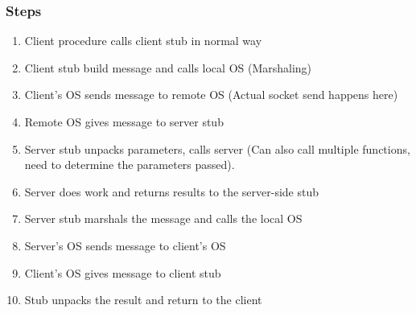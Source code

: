 \subsubsection{Steps}\label{subsubsec:RPC_Steps}
\begin{enumerate}[noitemsep]
\item Client procedure calls client stub in normal way
\item Client stub build message and calls local OS (Marshaling)
\item Client's OS sends message to remote OS (Actual socket send happens here)
\item Remote OS gives message to server stub
\item Server stub unpacks parameters, calls server (Can also call multiple functions, need to determine the parameters passed).
\item Server does work and returns results to the server-side stub
\item Server stub marshals the message and calls the local OS
\item Server's OS sends message to client's OS
\item Client's OS gives message to client stub
\item Stub unpacks the result and return to the client
\end{enumerate}


